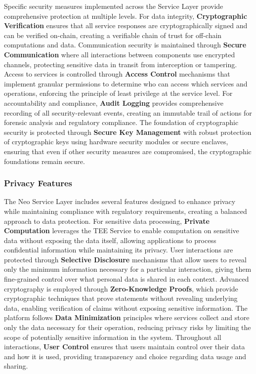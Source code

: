 \documentclass[11pt]{article}
\begin{document}
Specific security measures implemented across the Service Layer provide comprehensive protection at multiple levels. For data integrity, \textbf{Cryptographic Verification} ensures that all service responses are cryptographically signed and can be verified on-chain, creating a verifiable chain of trust for off-chain computations and data. Communication security is maintained through \textbf{Secure Communication} where all interactions between components use encrypted channels, protecting sensitive data in transit from interception or tampering. Access to services is controlled through \textbf{Access Control} mechanisms that implement granular permissions to determine who can access which services and operations, enforcing the principle of least privilege at the service level. For accountability and compliance, \textbf{Audit Logging} provides comprehensive recording of all security-relevant events, creating an immutable trail of actions for forensic analysis and regulatory compliance. The foundation of cryptographic security is protected through \textbf{Secure Key Management} with robust protection of cryptographic keys using hardware security modules or secure enclaves, ensuring that even if other security measures are compromised, the cryptographic foundations remain secure.

\subsubsection{Privacy Features}
\label{subsubsec:privacy-features}

The Neo Service Layer includes several features designed to enhance privacy while maintaining compliance with regulatory requirements, creating a balanced approach to data protection. For sensitive data processing, \textbf{Private Computation} leverages the TEE Service to enable computation on sensitive data without exposing the data itself, allowing applications to process confidential information while maintaining its privacy. User interactions are protected through \textbf{Selective Disclosure} mechanisms that allow users to reveal only the minimum information necessary for a particular interaction, giving them fine-grained control over what personal data is shared in each context. Advanced cryptography is employed through \textbf{Zero-Knowledge Proofs}, which provide cryptographic techniques that prove statements without revealing underlying data, enabling verification of claims without exposing sensitive information. The platform follows \textbf{Data Minimization} principles where services collect and store only the data necessary for their operation, reducing privacy risks by limiting the scope of potentially sensitive information in the system. Throughout all interactions, \textbf{User Control} ensures that users maintain control over their data and how it is used, providing transparency and choice regarding data usage and sharing.
\end{document}
